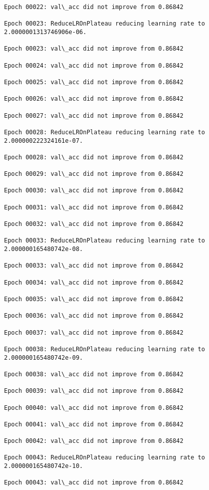 \documentclass[11pt]{article}
\begin{document}
\begin{Verbatim}[commandchars=\\\{\}]
Epoch 00022: val\_acc did not improve from 0.86842

Epoch 00023: ReduceLROnPlateau reducing learning rate to 2.0000001313746906e-06.

Epoch 00023: val\_acc did not improve from 0.86842

Epoch 00024: val\_acc did not improve from 0.86842

Epoch 00025: val\_acc did not improve from 0.86842

Epoch 00026: val\_acc did not improve from 0.86842

Epoch 00027: val\_acc did not improve from 0.86842

Epoch 00028: ReduceLROnPlateau reducing learning rate to 2.000000222324161e-07.

Epoch 00028: val\_acc did not improve from 0.86842

Epoch 00029: val\_acc did not improve from 0.86842

Epoch 00030: val\_acc did not improve from 0.86842

Epoch 00031: val\_acc did not improve from 0.86842

Epoch 00032: val\_acc did not improve from 0.86842

Epoch 00033: ReduceLROnPlateau reducing learning rate to 2.000000165480742e-08.

Epoch 00033: val\_acc did not improve from 0.86842

Epoch 00034: val\_acc did not improve from 0.86842

Epoch 00035: val\_acc did not improve from 0.86842

Epoch 00036: val\_acc did not improve from 0.86842

Epoch 00037: val\_acc did not improve from 0.86842

Epoch 00038: ReduceLROnPlateau reducing learning rate to 2.000000165480742e-09.

Epoch 00038: val\_acc did not improve from 0.86842

Epoch 00039: val\_acc did not improve from 0.86842

Epoch 00040: val\_acc did not improve from 0.86842

Epoch 00041: val\_acc did not improve from 0.86842

Epoch 00042: val\_acc did not improve from 0.86842

Epoch 00043: ReduceLROnPlateau reducing learning rate to 2.000000165480742e-10.

Epoch 00043: val\_acc did not improve from 0.86842


\end{Verbatim}
\end{document}
